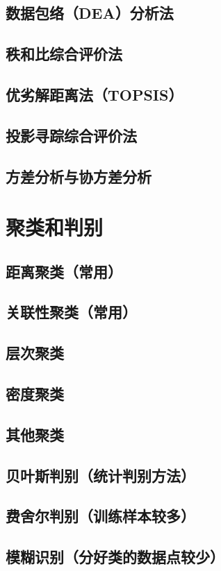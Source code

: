 \documentclass[openany]{progbookcn}
\begin{document}
\section{数据包络（DEA）分析法}
\section{秩和比综合评价法}
\section{优劣解距离法（TOPSIS）}
\section{投影寻踪综合评价法}
\section{方差分析与协方差分析}
\chapter{聚类和判别}
\section{距离聚类（常用）}
\section{关联性聚类（常用）}
\section{层次聚类}
\section{密度聚类}
\section{其他聚类}
\section{贝叶斯判别（统计判别方法）}
\section{费舍尔判别（训练样本较多）}
\section{模糊识别（分好类的数据点较少）}
\end{document}
